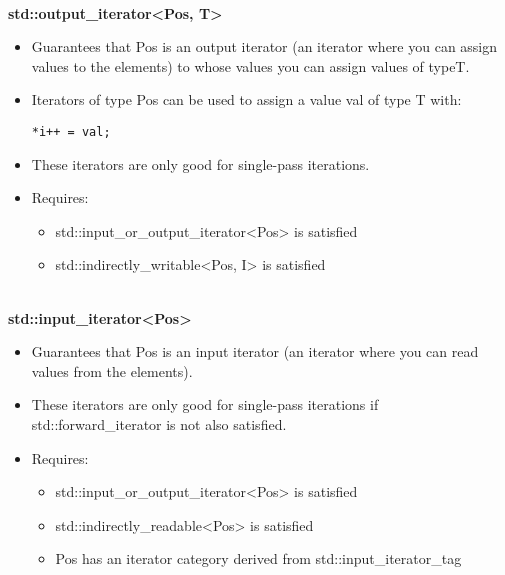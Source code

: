 \noindent
\hspace*{\fill} \\ %
\textbf{std::output\_iterator<Pos, T>}

\begin{itemize}
\item
Guarantees that Pos is an output iterator (an iterator where you can assign values to the elements) to whose values you can assign values of typeT.

\item
Iterators of type Pos can be used to assign a value val of type T with:

\begin{lstlisting}[style=styleCXX]
*i++ = val;
\end{lstlisting}

\item
These iterators are only good for single-pass iterations.

\item
Requires:
\begin{itemize}
\item
std::input\_or\_output\_iterator<Pos> is satisfied

\item
std::indirectly\_writable<Pos, I> is satisfied
\end{itemize}
\end{itemize}

\noindent
\hspace*{\fill} \\ %
\textbf{std::input\_iterator<Pos>}

\begin{itemize}
\item
Guarantees that Pos is an input iterator (an iterator where you can read values from the elements).

\item
These iterators are only good for single-pass iterations if std::forward\_iterator is not also satisfied.

\item
Requires:
\begin{itemize}
\item
std::input\_or\_output\_iterator<Pos> is satisfied

\item
std::indirectly\_readable<Pos> is satisfied

\item
Pos has an iterator category derived from std::input\_iterator\_tag
\end{itemize}
\end{itemize}


